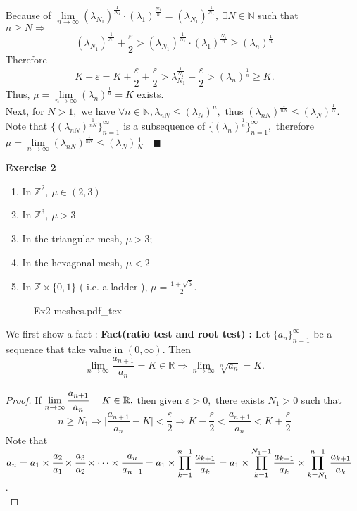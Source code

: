 \documentclass[12pt,a4paper]{article}
\newcommand{\SOL}{\fbox{ \tt s\parbox[b][2pt][c]{6pt}{o}\hspace*{-7pt} L:}}
\newcommand{\incfig}[1]{%
{#1.pdf_tex}
}
\begin{document}
\begin{enumerate}
\begin{align*}
	\end{align*}
	Because of $\lim\limits_{n\to\infty}(\lambda_{N_1})^{\frac{1}{N_1}}\cdot (\lambda_1)^{\frac{N_1}{n}}=(\lambda_{N_1})^\frac{1}{N_1},\ \exists N\in\mathbb{N}$ such that $n\geq N\Rightarrow$
	\[
	(\lambda_{N_1})^\frac{1}{N_1}+\frac{\varepsilon}{2}>(\lambda_{N_1})^\frac{1}{N_1}\cdot (\lambda_1)^{\frac{N_1}{n}}\geq (\lambda_n)^{\frac{1}{n}}
	\]
	Therefore 
	\[
	K+\varepsilon=K+\frac{\varepsilon}{2}+\frac{\varepsilon}{2}>\lambda_{N_1}^{\frac{1}{N_1}}+\frac{\varepsilon}{2}>(\lambda_n)^{\frac{1}{n}}\geq K.
	\]
	Thus, $\mu=\lim\limits_{n\to\infty}(\lambda_n)^\frac{1}{n}=K$ exists.\\
	Next, for $N>1,$ we have $\forall n\in \mathbb{N}, \lambda_{nN}\leq (\lambda_N)^n,$ thus $(\lambda_{nN})^\frac{1}{nN}\leq (\lambda_N)^\frac{1}{N}.$ Note that $\{(\lambda_{nN})^{\frac{1}{nN}}\}_{n=1}^{\infty}$ is a subsequence of $\{(\lambda_{n})^{\frac{1}{n}}\}_{n=1}^{\infty},$ therefore $\mu=\lim\limits_{n\to\infty}(\lambda_{nN})^\frac{1}{nN}\leq (\lambda_N)\frac{1}{N}\quad \blacksquare$
	\item[\textbf{Exercise 2}] \begin{enumerate}
		\item In $\mathbb{Z}^2,\ \mu\in (2,3)$
		\item In $\mathbb{Z}^3,\ \mu>3$
		\item In the triangular mesh, $\mu>3$;
		\item In the hexagonal mesh, $\mu<2$
		\item In $\mathbb{Z}\times \{0,1\}$ ( i.e. a ladder ), $\mu=\frac{1+\sqrt{5}}{2}.$
	\end{enumerate}
	\begin{figure}[htp]
	\centering
	\def\svgwidth{15cm}
	\incfig{Ex2 meshes}
	\end{figure}
	\item[\SOL] We first show a fact : 
	\newpage
	\textbf{Fact(ratio test and root test) :} Let $\{a_n\}_{n=1}^\infty$ be a sequence that take value in $(0,\infty).$ Then
	\[
	\lim_{n\to\infty}\frac{a_{n+1}}{a_n}=K\in\mathbb{R}\Rightarrow \lim_{n\to\infty}\sqrt[n]{a_n}=K.
	\]
	\begin{proof}
	If $\lim\limits_{n\to\infty}\cfrac{a_{n+1}}{a_n}=K\in\mathbb{R},$ then given $\varepsilon>0,$ there exists $N_1>0$ such that 
	\[
    	n\geq N_1\Rightarrow \Big|\frac{a_{n+1}}{a_n}-K\Big|<\frac{\varepsilon}{2}\Rightarrow K-\frac{\varepsilon}{2}<\frac{a_{n+1}}{a_n}<K+\frac{\varepsilon}{2}
	\]
	Note that $a_n=a_1\times \cfrac{a_2}{a_1}\times \cfrac{a_3}{a_2}\times \cdots \times \cfrac{a_n}{a_{n-1}}=a_1\times{\displaystyle \prod_{k=1}^{n-1} \frac{a_{k+1}}{a_k}}=a_1\times{\displaystyle \prod_{k=1}^{N_1-1} \frac{a_{k+1}}{a_k}}\times{\displaystyle \prod_{k=N_1}^{n-1} \frac{a_{k+1}}{a_k}}$ . \\

\end{proof}
\end{enumerate}
\end{document}
